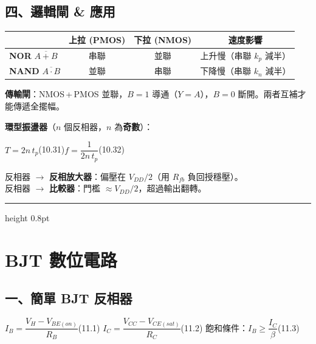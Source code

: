 \documentclass[10pt]{article}
\begin{document}
\subsection*{四、邏輯閘 \& 應用}

\renewcommand{\arraystretch}{1.2}
\begin{center}\small
\begin{tabular}{l c c c}
\toprule
& \textbf{上拉 (PMOS)} & \textbf{下拉 (NMOS)} & \textbf{速度影響} \\
\midrule
\textbf{NOR} $\overline{A+B}$ & 串聯 & 並聯 & 上升慢（串聯 $k_p$ 減半）\\
\textbf{NAND} $\overline{A \cdot B}$ & 並聯 & 串聯 & 下降慢（串聯 $k_n$ 減半）\\
\bottomrule
\end{tabular}
\end{center}

\textbf{傳輸閘}：NMOS\,+\,PMOS 並聯，$B=1$ 導通（$Y=A$），$B=0$ 斷開。兩者互補才能傳遞全擺幅。

\textbf{環型振盪器}（$n$ 個反相器，$n$ 為\textbf{奇數}）：
\begin{formulabox}
$T = 2n\,t_p$\hfill(10.31)\qquad $f = \dfrac{1}{2n\,t_p}$\hfill(10.32)
\end{formulabox}

反相器 $\to$ \textbf{反相放大器}：偏壓在 $V_{DD}/2$（用 $R_{fb}$ 負回授穩壓）。\\
反相器 $\to$ \textbf{比較器}：門檻 $\approx V_{DD}/2$，超過輸出翻轉。

\bigskip\hrule height 0.8pt\bigskip

\section*{\color{maincol} \quad BJT 數位電路}

\subsection*{一、簡單 BJT 反相器}

\begin{formulabox}
$I_B = \dfrac{V_H - V_{BE(on)}}{R_B}$\hfill(11.1)\qquad
$I_C = \dfrac{V_{CC} - V_{CE(sat)}}{R_C}$\hfill(11.2)\qquad
飽和條件：$I_B \ge \dfrac{I_C}{\beta}$\hfill(11.3)
\end{formulabox}
\end{document}
